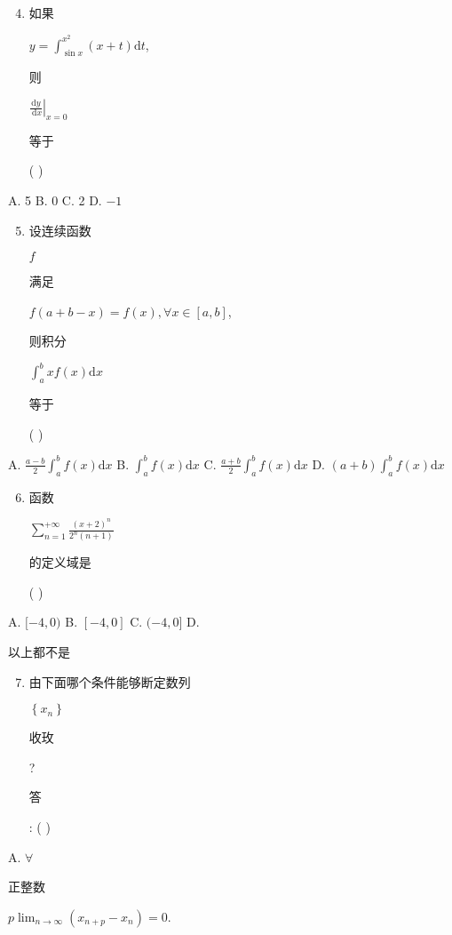 \documentclass[10pt]{article}
\begin{document}
\begin{enumerate}
  \setcounter{enumi}{3}
  \item \begin{CJK}{UTF8}{mj}如果\end{CJK} $y=\int_{\sin x}^{x^{2}}(x+t) \mathrm{d} t$, \begin{CJK}{UTF8}{mj}则\end{CJK} $\left.\frac{\mathrm{d} y}{\mathrm{~d} x}\right|_{x=0}$ \begin{CJK}{UTF8}{mj}等于\end{CJK} ( )
\end{enumerate}
A. 5 B. 0 C. 2 D. $-1$

\begin{enumerate}
  \setcounter{enumi}{4}
  \item \begin{CJK}{UTF8}{mj}设连续函数\end{CJK} $f$ \begin{CJK}{UTF8}{mj}满足\end{CJK} $f(a+b-x)=f(x), \forall x \in[a, b]$, \begin{CJK}{UTF8}{mj}则积分\end{CJK} $\int_{a}^{b} x f(x) \mathrm{d} x$ \begin{CJK}{UTF8}{mj}等于\end{CJK} ( )
\end{enumerate}
A. $\frac{a-b}{2} \int_{a}^{b} f(x) \mathrm{d} x$ B. $\int_{a}^{b} f(x) \mathrm{d} x$ C. $\frac{a+b}{2} \int_{a}^{b} f(x) \mathrm{d} x$ D. $(a+b) \int_{a}^{b} f(x) \mathrm{d} x$

\begin{enumerate}
  \setcounter{enumi}{5}
  \item \begin{CJK}{UTF8}{mj}函数\end{CJK} $\sum_{n=1}^{+\infty} \frac{(x+2)^{n}}{2^{n}(n+1)}$ \begin{CJK}{UTF8}{mj}的定义域是\end{CJK} ( )
\end{enumerate}
A. $[-4,0)$ B. $[-4,0]$ C. $(-4,0]$ D. \begin{CJK}{UTF8}{mj}以上都不是\end{CJK}

\begin{enumerate}
  \setcounter{enumi}{6}
  \item \begin{CJK}{UTF8}{mj}由下面哪个条件能够断定数列\end{CJK} $\left\{x_{n}\right\}$ \begin{CJK}{UTF8}{mj}收玫\end{CJK}? \begin{CJK}{UTF8}{mj}答\end{CJK}: ( )
\end{enumerate}
A. $\forall$ \begin{CJK}{UTF8}{mj}正整数\end{CJK} $p \lim _{n \rightarrow \infty}\left(x_{n+p}-x_{n}\right)=0$.
\end{document}
